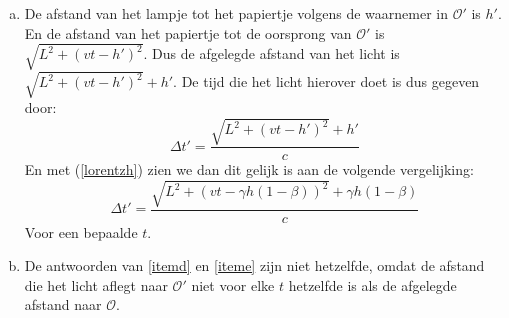 \documentclass[12pt, a4paper]{article}
\begin{document}
\begin{enumerate}[(a).]
    \item \label{iteme}
    De afstand van het lampje tot het papiertje volgens de waarnemer in $\mathcal{O}'$ 
    is $h'$. En de afstand van het papiertje tot de oorsprong van $\mathcal{O}'$ is 
    $\sqrt{L^2 + (vt-h')^2}$. Dus de afgelegde afstand van het licht is 
    $\sqrt{L^2 + (vt-h')^2} + h'$. 
    De tijd die het licht hierover doet is dus gegeven door:
    \begin{equation}
        \Delta t' = \frac{\sqrt{L^2 + (vt-h')^2} + h'}{c}
    \end{equation}
    En met (\ref{lorentzh}) zien we dan dit gelijk is aan de volgende vergelijking:
    \begin{equation}
        \Delta t' = \frac{\sqrt{L^2 + (vt-\gamma h\left( 1-\beta\right))^2} +
        \gamma h\left( 1-\beta\right)}{c}
    \end{equation}
    Voor een bepaalde $t$.

    \item 
    De antwoorden van \ref{itemd} en \ref{iteme} zijn niet hetzelfde, 
    omdat de afstand die het licht aflegt naar $\mathcal{O}'$ niet voor elke $t$
    hetzelfde is als de afgelegde afstand naar $\mathcal{O}$.
\end{enumerate}
\end{document}
